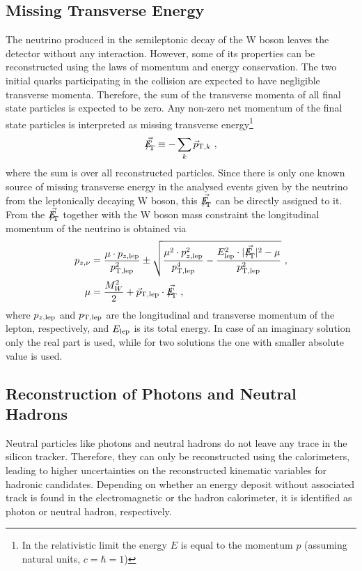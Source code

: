 \subsection{Missing Transverse Energy}
The neutrino produced in the semileptonic decay of the W boson leaves the detector without any interaction. However, some of its properties can be reconstructed using the laws of momentum and energy conservation. The two initial quarks participating in the collision are expected to have negligible transverse momenta. Therefore, the sum of the transverse momenta of all final state particles is expected to be zero. Any non-zero net momentum of the final state particles is interpreted as missing transverse energy\footnote{In the relativistic limit the energy $E$ is equal to the momentum $p$ (assuming natural units, $c=\hbar=1$)}\cite{MET}
\begin{equation}
\vec{{E\!\!\!\!/}_{\!\mathrm{T}}} \equiv -\sum_k \vec{p}_{{\rm T},k} ~,
\end{equation}
where the sum is over all reconstructed particles. Since there is only one known source of missing transverse energy in the analysed events given by the neutrino from the leptonically decaying W boson, this $\vec{{E\!\!\!\!/}_{\!\mathrm{T}}}$ can be directly assigned to it. From the $\vec{{E\!\!\!\!/}_{\!\mathrm{T}}}$ together with the W boson mass constraint the longitudinal momentum of the neutrino is obtained \cite{PAS} via
\begin{align}
p_{z,\nu} &= \frac{\mu \cdot p_{z,{\rm lep}}}{p_{\rm T,lep}^2} \pm \sqrt{\frac{\mu^2 \cdot p_{z,{\rm lep}}^2}{p_{\rm T,lep}^4} - \frac{E_{\rm lep}^2 \cdot |\vec{\MET}|^2 - \mu}{p_{\rm T,lep}^2}} ~, \\
\mu &= \frac{M_W^2}{2} + \vec{p}_{\rm T,lep}\cdot \vec{\MET} ~,
\end{align} 
where $p_{z,{\rm lep}}$ and $p_{\rm T,lep}$ are the longitudinal  and transverse momentum of the lepton, respectively, and $E_{\rm lep}$ is its total energy. In case of an imaginary solution only the real part is used, while for two solutions the one with smaller absolute value is used.
\subsection{Reconstruction of Photons and Neutral Hadrons}
Neutral particles like photons and neutral hadrons do not leave any trace in the silicon tracker. Therefore, they can only be reconstructed using the calorimeters, leading to higher uncertainties on the reconstructed kinematic variables for hadronic candidates. Depending on whether an energy deposit without associated track is found in the electromagnetic or the hadron calorimeter, it is identified as photon or neutral hadron, respectively. 
